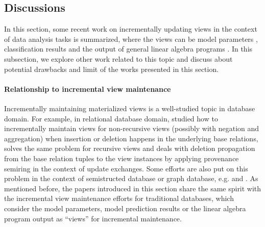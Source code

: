 

\subsection{Discussions}
In this section, some recent work on incrementally updating views in the context of data analysis tasks is summarized, where the views can be model parameters \cite{deshpande2006mauvedb, gupta2015processing}, classification results \cite{koc2011incrementally} and the output of general linear algebra programs \cite{nikolic2014linview}. In this subsection, we explore other work related to this topic and discuss about potential drawbacks and limit of the works presented in this section.

\paragraph{Relationship to incremental view maintenance} 
Incrementally maintaining materialized views is a well-studied topic in database domain. For example, in relational database domain, \cite{gupta1993maintaining} studied how to incrementally maintain views for non-recursive views (possibly with negation and aggregation) when insertion or deletion happens in the underlying base relations, \cite{dong2000incremental} solves the same problem for recursive views and \cite{green2007update} deals with deletion propagation from the base relation tuples to the view instances by applying provenance semiring \cite{green2007provenance} in the context of update exchanges. Some efforts are also put on this problem in the context of semistructed database or graph database, e.g. \cite{liefke2000view} and \cite{abiteboul1998incremental}. As mentioned before, the papers introduced in this section share the same spirit with the incremental view maintenance efforts for traditional databases, which consider the model parameters, model prediction results or the linear algebra program output as ``views'' for incremental maintenance.

